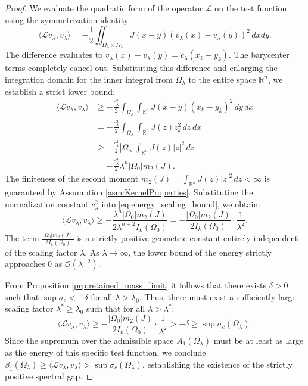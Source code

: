 \documentclass[11pt, a4paper]{article}
\theoremstyle{break}
\theoremstyle{break}
\theoremstyle{break}
\theoremstyle{break}
\theoremstyle{break}
\theoremstyle{break}
\theoremstyle{break}
\theoremstyle{break}
\theoremstyle{break}
\begin{document}
\begin{proof}
    We evaluate the quadratic form of the operator $\mathcal{L}$ on the test function using the symmetrization identity
    \begin{equation}
        \langle \mathcal{L}v_\lambda, v_\lambda \rangle = -\frac{1}{2} \iint_{\Omega_\lambda \times \Omega_\lambda} J(x-y) (v_\lambda(x) - v_\lambda(y))^2 \, dx dy.
    \end{equation}
    The difference evaluates to $v_\lambda(x) - v_\lambda(y) = c_\lambda(x_k - y_k)$. The barycenter terms completely cancel out. Substituting this difference and enlarging the integration domain for the inner integral from $\Omega_\lambda$ to the entire space $\mathbb{R}^n$, we establish a strict lower bound:
    \begin{align} \label{eq:energy_scaling_bound}
        \langle \mathcal{L}v_\lambda, v_\lambda \rangle &\geq -\frac{c_\lambda^2}{2} \int_{\Omega_\lambda} \int_{\mathbb{R}^n} J(x-y) (x_k - y_k)^2 \, dy \, dx \nonumber \\
        &= -\frac{c_\lambda^2}{2} \int_{\Omega_\lambda} \int_{\mathbb{R}^n} J(z) z_k^2 \, dz \, dx \nonumber \\
        &\geq -\frac{c_\lambda^2}{2} |\Omega_\lambda| \int_{\mathbb{R}^n} J(z) |z|^2 \, dz \nonumber \\
        &= -\frac{c_\lambda^2}{2} \lambda^n |\Omega_0| m_2(J).
    \end{align}
    The finiteness of the second moment $m_2(J) = \int_{\mathbb{R}^n} J(z) |z|^2 \, dz < \infty$ is guaranteed by Assumption \ref{asm:KernelProperties}. Substituting the normalization constant $c_\lambda^2$ into \eqref{eq:energy_scaling_bound}, we obtain:
    \begin{equation}
        \langle \mathcal{L}v_\lambda, v_\lambda \rangle \geq -\frac{\lambda^n |\Omega_0| m_2(J)}{2 \lambda^{n+2} I_k(\Omega_0)} = -\frac{|\Omega_0| m_2(J)}{2 I_k(\Omega_0)} \cdot \frac{1}{\lambda^2}.
    \end{equation}
    The term $\frac{|\Omega_0| m_2(J)}{2 I_k(\Omega_0)}$ is a strictly positive geometric constant entirely independent of the scaling factor $\lambda$. As $\lambda \to \infty$, the lower bound of the energy strictly approaches $0$ as $\mathcal{O}(\lambda^{-2})$. 
    
    From Proposition \ref{prp:retained_mass_limit} it follows that there exists $\delta > 0$ such that $\sup \sigma_c < - \delta$ for all $\lambda > \lambda_0$. Thus, there must exist a sufficiently large scaling factor $\lambda^* \geq \lambda_0$ such that for all $\lambda > \lambda^*$:
    \begin{equation}
        \langle \mathcal{L}v_\lambda, v_\lambda \rangle \geq -\frac{|\Omega_0| m_2(J)}{2 I_k(\Omega_0)} \cdot \frac{1}{\lambda^2} > -\delta \geq \sup \sigma_c(\Omega_\lambda).
    \end{equation}
    Since the supremum over the admissible space $A_1(\Omega_\lambda)$ must be at least as large as the energy of this specific test function, we conclude $\beta_1(\Omega_\lambda) \geq \langle \mathcal{L}v_\lambda, v_\lambda \rangle > \sup \sigma_c(\Omega_\lambda)$, establishing the existence of the strictly positive spectral gap.
\end{proof}
\end{document}
